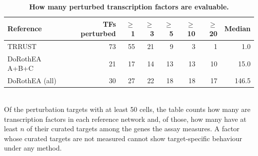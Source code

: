 \begin{table}[htbp]
\centering
\caption{\textbf{How many perturbed transcription factors are evaluable.}}
\label{tab:evaluability}
\smallskip
\small
\begin{tabular}{lrrrrrrr}
\toprule
Reference & TFs perturbed & $\geq$1 & $\geq$3 & $\geq$5 & $\geq$10 & $\geq$20 & Median \\
\midrule
TRRUST & 73 & 55 & 21 & 9 & 3 & 1 & 1.0 \\
DoRothEA A+B+C & 21 & 17 & 14 & 13 & 13 & 10 & 15.0 \\
DoRothEA (all) & 30 & 27 & 22 & 18 & 18 & 17 & 146.5 \\
\bottomrule
\end{tabular}
\\[2pt]
\footnotesize Of the perturbation targets with at least 50 cells, the table counts how many are transcription factors in each reference network and, of those, how many have at least $n$ of their curated targets among the genes the assay measures. A factor whose curated targets are not measured cannot show target-specific behaviour under any method.
\end{table}
